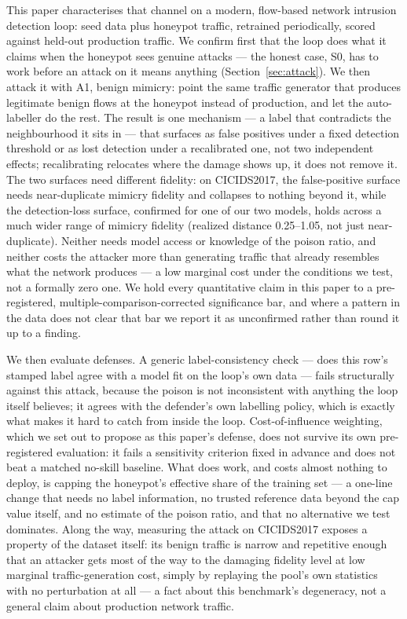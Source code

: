 This paper characterises that channel on a modern, flow-based network intrusion detection loop:
seed data plus honeypot traffic, retrained periodically, scored against held-out production
traffic. We confirm first that the loop does what it claims when the honeypot sees genuine
attacks — the honest case, S0, has to work before an attack on it means anything
(Section~\ref{sec:attack}). We then attack it with A1, benign mimicry: point the same traffic
generator that produces legitimate benign flows at the honeypot instead of production, and let
the auto-labeller do the rest. The result is one mechanism — a label that contradicts the
neighbourhood it sits in — that surfaces as false positives under a fixed detection threshold or
as lost detection under a recalibrated one, not two independent effects; recalibrating relocates
where the damage shows up, it does not remove it. The two surfaces need different fidelity: on
CICIDS2017, the false-positive surface needs near-duplicate mimicry fidelity and collapses to
nothing beyond it, while the detection-loss surface, confirmed for one of our two models, holds
across a much wider range of mimicry fidelity (realized distance 0.25--1.05, not just
near-duplicate). Neither needs model access or knowledge of the poison ratio, and neither costs
the attacker more than generating traffic that already resembles what the network produces — a
low marginal cost under the conditions we test, not a formally zero one. We hold every
quantitative claim in this paper to a pre-registered, multiple-comparison-corrected significance
bar, and where a pattern in the data does not clear that bar we report it as unconfirmed rather
than round it up to a finding.

We then evaluate defenses. A generic label-consistency check — does this row's stamped label
agree with a model fit on the loop's own data — fails structurally against this attack, because
the poison is not inconsistent with anything the loop itself believes; it agrees with the
defender's own labelling policy, which is exactly what makes it hard to catch from inside the
loop. Cost-of-influence weighting, which we set out to propose as this paper's defense, does not
survive its own pre-registered evaluation: it fails a sensitivity criterion fixed in advance and
does not beat a matched no-skill baseline. What does work, and costs almost nothing to deploy,
is capping the honeypot's effective share of the training set — a one-line change that needs no
label information, no trusted reference data beyond the cap value itself, and no estimate of the
poison ratio, and that no alternative we test dominates. Along the way, measuring the attack on
CICIDS2017 exposes a property of the dataset itself: its benign traffic is narrow and repetitive
enough that an attacker gets most of the way to the damaging fidelity level at low marginal
traffic-generation cost, simply by replaying the pool's own statistics with no perturbation at
all — a fact about this benchmark's degeneracy, not a general claim about production network
traffic.

